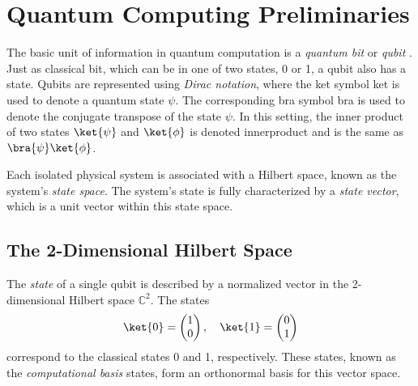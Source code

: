 






\section{Quantum Computing Preliminaries} \label{sec:Quantum Computing Preliminaries}

The basic unit of information in quantum computation is a \emph{quantum bit} or \emph{qubit} \cite{perdrix2008quantum}. Just as classical bit, which can be in one of two states, 0 or 1, a qubit also has a state. Qubits are represented using \emph{Dirac notation},  where the ket symbol \gls{ket} is used to denote a quantum state $\psi$. The corresponding bra symbol \gls{bra} is used to denote the conjugate transpose of the state $\psi$. In this setting, the inner product of two states $\ket{\psi}$ and $\ket{\phi}$ is denoted \gls{innerproduct} and is the same as $\bra{\psi} \ket{\phi}$. %

\begin{definition}
  Each isolated physical system is associated with a Hilbert space, known as the system's \emph{state space}. The system's state is fully characterized by a \emph{state vector}, which is a unit vector within this state space.
\end{definition}

\subsection{The 2-Dimensional Hilbert Space} \label{subsec:hilb2D}
 

\begin{definition}
  The \emph{state} of a single qubit is described by a normalized vector in the 2-dimensional Hilbert space \( \mathbb{C}^{2} \). The states 
  \[
  \ket{0} = \begin{pmatrix} 1\\0 \end{pmatrix}, \quad \ket{1} =   \begin{pmatrix} 0\\1 \end{pmatrix}
  \]
  correspond to the classical states 0 and 1, respectively. These states, known as the \emph{computational basis} states, form an orthonormal basis for this vector space.
\end{definition}


